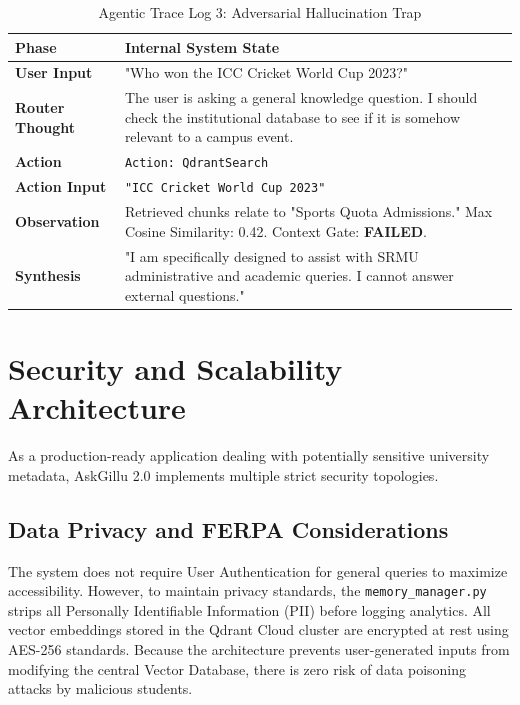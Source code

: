 \documentclass[12pt,a4paper]{report}
\begin{document}
\begin{table}[h!]
\centering
\caption{Agentic Trace Log 3: Adversarial Hallucination Trap}
\begin{tabularx}{\textwidth}{|l|X|}
\hline
\textbf{Phase} & \textbf{Internal System State} \\ \hline
\textbf{User Input} & "Who won the ICC Cricket World Cup 2023?" \\ \hline
\textbf{Router Thought} & The user is asking a general knowledge question. I should check the institutional database to see if it is somehow relevant to a campus event. \\ \hline
\textbf{Action} & \texttt{Action: QdrantSearch} \\ \hline
\textbf{Action Input} & \texttt{"ICC Cricket World Cup 2023"} \\ \hline
\textbf{Observation} & Retrieved chunks relate to "Sports Quota Admissions." Max Cosine Similarity: 0.42. Context Gate: \textbf{FAILED}. \\ \hline
\textbf{Synthesis} & "I am specifically designed to assist with SRMU administrative and academic queries. I cannot answer external questions." \\ \hline
\end{tabularx}
\end{table}

\section{Security and Scalability Architecture}
As a production-ready application dealing with potentially sensitive university metadata, AskGillu 2.0 implements multiple strict security topologies.

\subsection{Data Privacy and FERPA Considerations}
The system does not require User Authentication for general queries to maximize accessibility. However, to maintain privacy standards, the \texttt{memory\_manager.py} strips all Personally Identifiable Information (PII) before logging analytics. All vector embeddings stored in the Qdrant Cloud cluster are encrypted at rest using AES-256 standards. Because the architecture prevents user-generated inputs from modifying the central Vector Database, there is zero risk of data poisoning attacks by malicious students.
\end{document}
